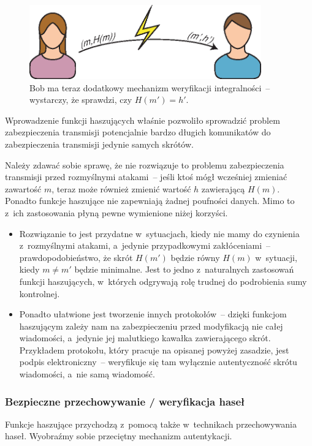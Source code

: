 \begin{figure}[htb!]
    \includegraphics[width=10cm]{img/usage1b.eps}
    \caption{Bob ma teraz dodatkowy mechanizm weryfikacji integralności~--
    wystarczy, że sprawdzi, czy $H(m')=h'$.}
    \label{fig:usage_integrity_check_2}
\end{figure}

Wprowadzenie funkcji haszujących właśnie pozwoliło sprowadzić problem
zabezpieczenia transmisji potencjalnie bardzo długich komunikatów do
zabezpieczenia transmisji jedynie samych skrótów.

Należy zdawać sobie sprawę, że nie rozwiązuje to problemu zabezpieczenia
transmisji przed rozmyślnymi atakami~-- jeśli ktoś mógł wcześniej zmieniać
zawartość $m$, teraz może również zmienić wartość $h$ zawierającą $H(m)$.
Ponadto funkcje haszujące nie zapewniają żadnej poufności danych. Mimo to z~ich
zastosowania płyną pewne wymienione niżej korzyści.

\begin{itemize}

    \item Rozwiązanie to jest przydatne w~sytuacjach, kiedy nie mamy do
    czynienia z~rozmyślnymi atakami, a~jedynie przypadkowymi zakłóceniami~--
    prawdopodobieństwo, że skrót $H(m')$ będzie równy $H(m)$ w~sytuacji, kiedy
    $m \neq m'$ będzie minimalne. Jest to jedno z~naturalnych zastosowań
    funkcji haszujących, w~których odgrywają rolę trudnej do podrobienia sumy
    kontrolnej.

    \item Ponadto ułatwione jest tworzenie innych protokołów~-- dzięki funkcjom
    haszującym zależy nam na zabezpieczeniu przed modyfikacją nie całej
    wiadomości, a~jedynie jej malutkiego kawałka zawierającego skrót.
    Przykładem protokołu, który pracuje na opisanej powyżej zasadzie, jest
    podpis elektroniczny~--  weryfikuje się tam wyłącznie
    autentyczność skrótu wiadomości, a~nie samą wiadomość.

\end{itemize}



\subsubsection{Bezpieczne przechowywanie / weryfikacja haseł}
\label{sec:usage_password_check}
Funkcje haszujące przychodzą z~pomocą także w~technikach przechowywania haseł.
Wyobraźmy sobie przeciętny mechanizm autentykacji.

